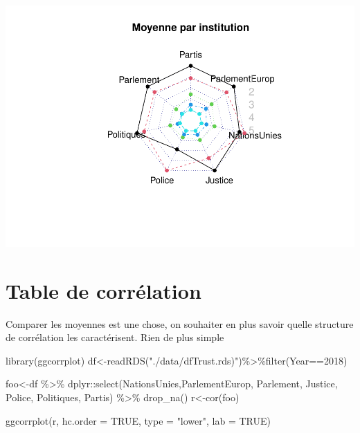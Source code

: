\documentclass[
]{book}
\newenvironment{Shaded}{\begin{snugshade}}{\end{snugshade}}
\newcommand{\AttributeTok}[1]{\textcolor[rgb]{0.77,0.63,0.00}{#1}}
\newcommand{\ConstantTok}[1]{\textcolor[rgb]{0.00,0.00,0.00}{#1}}
\newcommand{\DecValTok}[1]{\textcolor[rgb]{0.00,0.00,0.81}{#1}}
\newcommand{\FunctionTok}[1]{\textcolor[rgb]{0.00,0.00,0.00}{#1}}
\newcommand{\NormalTok}[1]{#1}
\newcommand{\OtherTok}[1]{\textcolor[rgb]{0.56,0.35,0.01}{#1}}
\newcommand{\SpecialCharTok}[1]{\textcolor[rgb]{0.00,0.00,0.00}{#1}}
\newcommand{\StringTok}[1]{\textcolor[rgb]{0.31,0.60,0.02}{#1}}
\begin{document}
\includegraphics{bookdown-demo_files/figure-latex/0504-1.pdf}

\hypertarget{table-de-corruxe9lation}{%
\section{Table de corrélation}\label{table-de-corruxe9lation}}

Comparer les moyennes est une chose, on souhaiter en plus savoir quelle structure de corrélation les caractérisent. Rien de plus simple

\begin{Shaded}
\begin{Highlighting}[]
\FunctionTok{library}\NormalTok{(ggcorrplot)}
\NormalTok{df}\OtherTok{\textless{}{-}}\FunctionTok{readRDS}\NormalTok{(}\StringTok{"./data/dfTrust.rds)"}\NormalTok{)}\SpecialCharTok{\%\textgreater{}\%}\FunctionTok{filter}\NormalTok{(Year}\SpecialCharTok{==}\DecValTok{2018}\NormalTok{)}

\NormalTok{foo}\OtherTok{\textless{}{-}}\NormalTok{df }\SpecialCharTok{\%\textgreater{}\%}\NormalTok{ dplyr}\SpecialCharTok{::}\FunctionTok{select}\NormalTok{(NationsUnies,ParlementEurop, Parlement, Justice, Police, Politiques, Partis) }\SpecialCharTok{\%\textgreater{}\%} 
  \FunctionTok{drop\_na}\NormalTok{()}
\NormalTok{r}\OtherTok{\textless{}{-}}\FunctionTok{cor}\NormalTok{(foo)}

\FunctionTok{ggcorrplot}\NormalTok{(r, }\AttributeTok{hc.order =} \ConstantTok{TRUE}\NormalTok{, }\AttributeTok{type =} \StringTok{"lower"}\NormalTok{,}
   \AttributeTok{lab =} \ConstantTok{TRUE}\NormalTok{)}
\end{Highlighting}
\end{Shaded}
\end{document}
